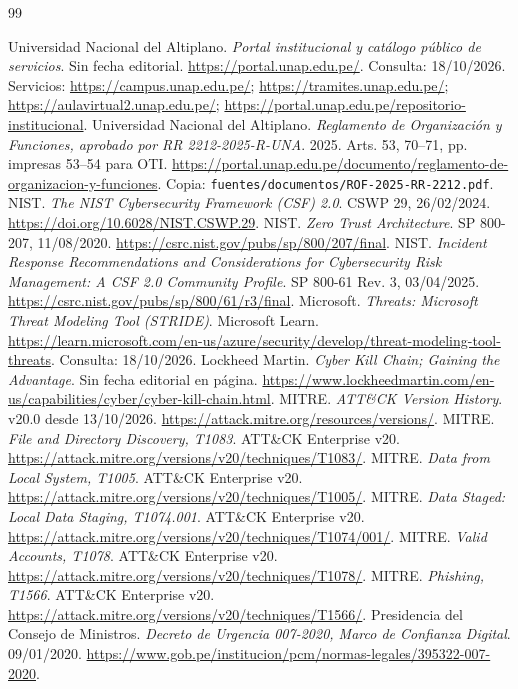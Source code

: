 \documentclass[10pt,a4paper]{article}
\newcommand{\archivo}[1]{{\ttfamily\nolinkurl{#1}}}
\begin{document}
\clearpage
\begin{thebibliography}{99}
 Universidad Nacional del Altiplano. \emph{Portal institucional y catálogo público de servicios}. Sin fecha editorial. \url{https://portal.unap.edu.pe/}. Consulta: 18/10/2026. Servicios: \url{https://campus.unap.edu.pe/}; \url{https://tramites.unap.edu.pe/}; \url{https://aulavirtual2.unap.edu.pe/}; \url{https://portal.unap.edu.pe/repositorio-institucional}.
 Universidad Nacional del Altiplano. \emph{Reglamento de Organización y Funciones, aprobado por RR 2212-2025-R-UNA}. 2025. Arts. 53, 70--71, pp. impresas 53--54 para OTI. \url{https://portal.unap.edu.pe/documento/reglamento-de-organizacion-y-funciones}. Copia: \archivo{fuentes/documentos/ROF-2025-RR-2212.pdf}.
 NIST. \emph{The NIST Cybersecurity Framework (CSF) 2.0}. CSWP 29, 26/02/2024. \url{https://doi.org/10.6028/NIST.CSWP.29}.
 NIST. \emph{Zero Trust Architecture}. SP 800-207, 11/08/2020. \url{https://csrc.nist.gov/pubs/sp/800/207/final}.
 NIST. \emph{Incident Response Recommendations and Considerations for Cybersecurity Risk Management: A CSF 2.0 Community Profile}. SP 800-61 Rev. 3, 03/04/2025. \url{https://csrc.nist.gov/pubs/sp/800/61/r3/final}.
 Microsoft. \emph{Threats: Microsoft Threat Modeling Tool (STRIDE)}. Microsoft Learn. \url{https://learn.microsoft.com/en-us/azure/security/develop/threat-modeling-tool-threats}. Consulta: 18/10/2026.
 Lockheed Martin. \emph{Cyber Kill Chain; Gaining the Advantage}. Sin fecha editorial en página. \url{https://www.lockheedmartin.com/en-us/capabilities/cyber/cyber-kill-chain.html}.
 MITRE. \emph{ATT\&CK Version History}. v20.0 desde 13/10/2026. \url{https://attack.mitre.org/resources/versions/}.
 MITRE. \emph{File and Directory Discovery, T1083}. ATT\&CK Enterprise v20. \url{https://attack.mitre.org/versions/v20/techniques/T1083/}.
 MITRE. \emph{Data from Local System, T1005}. ATT\&CK Enterprise v20. \url{https://attack.mitre.org/versions/v20/techniques/T1005/}.
 MITRE. \emph{Data Staged: Local Data Staging, T1074.001}. ATT\&CK Enterprise v20. \url{https://attack.mitre.org/versions/v20/techniques/T1074/001/}.
 MITRE. \emph{Valid Accounts, T1078}. ATT\&CK Enterprise v20. \url{https://attack.mitre.org/versions/v20/techniques/T1078/}.
 MITRE. \emph{Phishing, T1566}. ATT\&CK Enterprise v20. \url{https://attack.mitre.org/versions/v20/techniques/T1566/}.
 Presidencia del Consejo de Ministros. \emph{Decreto de Urgencia 007-2020, Marco de Confianza Digital}. 09/01/2020. \url{https://www.gob.pe/institucion/pcm/normas-legales/395322-007-2020}.

\end{thebibliography}
\end{document}
